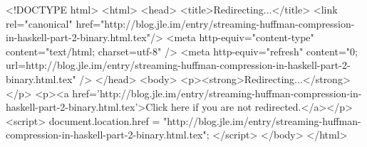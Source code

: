 <!DOCTYPE html>
<html>
<head>
<title>Redirecting...</title>
<link rel="canonical" href="http://blog.jle.im/entry/streaming-huffman-compression-in-haskell-part-2-binary.html.tex"/>
<meta http-equiv="content-type" content="text/html; charset=utf-8" />
<meta http-equiv="refresh" content="0; url=http://blog.jle.im/entry/streaming-huffman-compression-in-haskell-part-2-binary.html.tex" />
</head>
<body>
  <p><strong>Redirecting...</strong></p>
  <p><a href='http://blog.jle.im/entry/streaming-huffman-compression-in-haskell-part-2-binary.html.tex'>Click here if you are not redirected.</a></p>
  <script>
    document.location.href = "http://blog.jle.im/entry/streaming-huffman-compression-in-haskell-part-2-binary.html.tex";
  </script>
</body>
</html>
